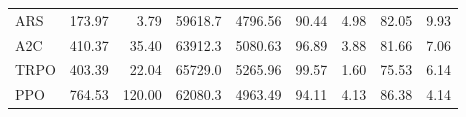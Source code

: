\begin{samepage}
\begin{center}
\begin{tabular}{l|rr|rr|rr|rr}
    ARS          &   173.97 &     3.79 &    59618.7 &    4796.56 &   90.44 &    4.98 &   82.05 &    9.93 \\
    A2C          &   410.37 &    35.40 &    63912.3 &    5080.63 &   96.89 &    3.88 &   81.66 &    7.06 \\
    TRPO         &   403.39 &    22.04 &    65729.0 &    5265.96 &   99.57 &    1.60 &   75.53 &    6.14 \\
    PPO          &   764.53 &   120.00 &    62080.3 &    4963.49 &   94.11 &    4.13 &   86.38 &    4.14 \\
    \bottomrule
  \end{tabular}
\end{center}
\end{samepage}

